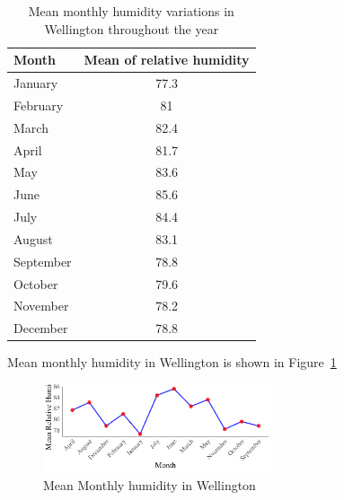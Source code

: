 \begin{table}[hbt]
	\centering
	\begin{tabular}{lc}
		\toprule
		 Month & Mean of relative humidity \\
		\midrule
		January & 77.3 \\ 
		February & 81 \\
		March & 82.4 \\
		April & 81.7 \\
		May & 83.6 \\ 
		June & 85.6 \\
		July & 84.4 \\
		August & 83.1 \\ 
		September & 78.8 \\
		October & 79.6 \\
		November & 78.2 \\
		December & 78.8 \\
		\bottomrule
	\end{tabular}
	\caption{Mean monthly humidity variations in Wellington throughout the year}
	\label{tab:humidity}
\end{table}

Mean monthly humidity in Wellington is shown in Figure~\ref{fig:humidity}  
\begin{figure}[hbt]
	\centering
	\includegraphics[width=0.6\textwidth]{humidity graph}
	\caption{Mean Monthly humidity in Wellington}
	\label{fig:humidity}
\end{figure}

